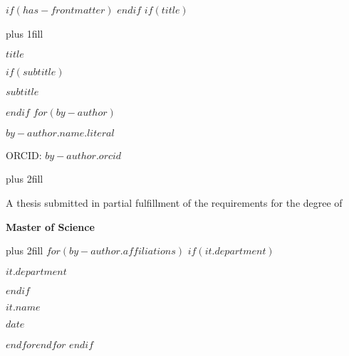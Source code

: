 $if(has-frontmatter)$
\frontmatter
$endif$
$if(title)$
\cleardoublepage
\thispagestyle{empty}
{\centering
\hbox{}\vskip 0cm plus 1fill
{\Large\bfseries $title$ \par}
$if(subtitle)$
\vspace{3ex}
{\small\bfseries $subtitle$ \par}
$endif$
\vspace{12ex}
$for(by-author)$
{\Large\bfseries $by-author.name.literal$ \par}
\vspace{3ex}
{\small ORCID: $by-author.orcid$ \par}
\vskip 0cm plus 2fill
\vspace{5ex}
{\large A thesis submitted in partial fulfillment of the requirements for the degree of \par}
{\bfseries\large Master of Science \par}
\vskip 0cm plus 2fill
\vspace{5ex}
$for(by-author.affiliations)$%
$if(it.department)$%
{\bfseries\large $it.department$ \par}
$endif$%
{\bfseries\large $it.name$ \par}
\vspace{12ex}
{\bfseries\large $date$ \par}
\vspace{12ex}
}
$endfor$$endfor$%
$endif$
\let\mainmatterreal\mainmatter
\let\mainmatter\relax